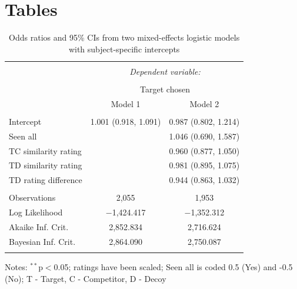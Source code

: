 \documentclass[12pt, a4paper]{article}
\begin{document}


\newpage



\newpage

\theendnotes

\newpage

\section*{Tables}


\begin{table}[htb] \centering
  \begin{threeparttable}
    \captionsetup{justification=centering}
    \caption{Odds ratios and 95\% CIs from two mixed-effects logistic models with subject-specific intercepts}
  \label{latentattr_exp2reg} 
\begin{tabular}{@{\extracolsep{5pt}}lcc} 
\\[-1.8ex]\hline 
\hline \\[-1.8ex] 
 & \multicolumn{2}{c}{\textit{Dependent variable:}} \\ 
\cline{2-3} 
\\[-1.8ex] & \multicolumn{2}{c}{Target chosen} \\ 
 & Model 1 & Model 2 \\ 
\hline \\[-1.8ex] 
 Intercept & 1.001 (0.918, 1.091) & 0.987 (0.802, 1.214) \\ 
  Seen all &  & 1.046 (0.690, 1.587) \\ 
  TC similarity rating &  & 0.960 (0.877, 1.050) \\ 
  TD similarity rating &  & 0.981 (0.895, 1.075) \\ 
  TD rating difference &  & 0.944 (0.863, 1.032) \\ 
 \hline \\[-1.8ex] 
Observations & 2,055 & 1,953 \\ 
Log Likelihood & $-$1,424.417 & $-$1,352.312 \\ 
Akaike Inf. Crit. & 2,852.834 & 2,716.624 \\ 
Bayesian Inf. Crit. & 2,864.090 & 2,750.087 \\ 
\hline 
\hline \\[-1.8ex] 
\end{tabular}  
    \begin{tablenotes}
      \small
      \item Notes: $^{**}$p$<$0.05; ratings have been scaled; Seen all is coded 0.5 (Yes) and -0.5 (No); T - Target, C - Competitor, D - Decoy
    \end{tablenotes}
  \end{threeparttable}
\end{table}
\end{document}
